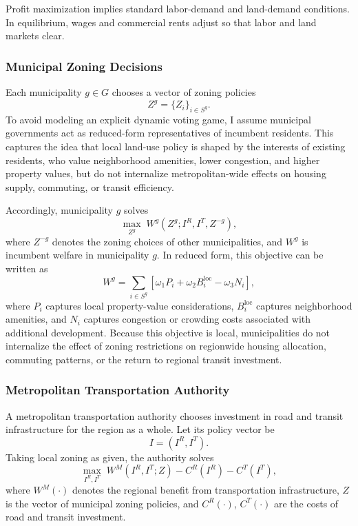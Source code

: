\documentclass[12pt, a4paper]{article}
\begin{document}
Profit maximization implies standard labor-demand and land-demand conditions. In equilibrium, wages and commercial rents adjust so that labor and land markets clear.

\subsubsection{Municipal Zoning Decisions}

Each municipality \(g\in G\) chooses a vector of zoning policies
\[
Z^g=\{Z_i\}_{i\in S^g}.
\]
To avoid modeling an explicit dynamic voting game, I assume municipal governments act as reduced-form representatives of incumbent residents. This captures the idea that local land-use policy is shaped by the interests of existing residents, who value neighborhood amenities, lower congestion, and higher property values, but do not internalize metropolitan-wide effects on housing supply, commuting, or transit efficiency.

Accordingly, municipality \(g\) solves
\[
\max_{Z^g} \; W^g(Z^g; I^R, I^T, Z^{-g}),
\]
where \(Z^{-g}\) denotes the zoning choices of other municipalities, and \(W^g\) is incumbent welfare in municipality \(g\). In reduced form, this objective can be written as
\[
W^g
=
\sum_{i\in S^g}
\left[
\omega_1 P_i
+\omega_2 B_i^{\text{loc}}
-\omega_3 N_i
\right],
\]
where \(P_i\) captures local property-value considerations, \(B_i^{\text{loc}}\) captures neighborhood amenities, and \(N_i\) captures congestion or crowding costs associated with additional development. Because this objective is local, municipalities do not internalize the effect of zoning restrictions on regionwide housing allocation, commuting patterns, or the return to regional transit investment.

\subsubsection{Metropolitan Transportation Authority}

A metropolitan transportation authority chooses investment in road and transit infrastructure for the region as a whole. Let its policy vector be
\[
I=(I^R,I^T).
\]
Taking local zoning as given, the authority solves
\[
\max_{I^R,I^T} \; W^M(I^R,I^T; Z)-C^R(I^R)-C^T(I^T),
\]
where \(W^M(\cdot)\) denotes the regional benefit from transportation infrastructure, \(Z\) is the vector of municipal zoning policies, and \(C^R(\cdot)\), \(C^T(\cdot)\) are the costs of road and transit investment.
\end{document}
